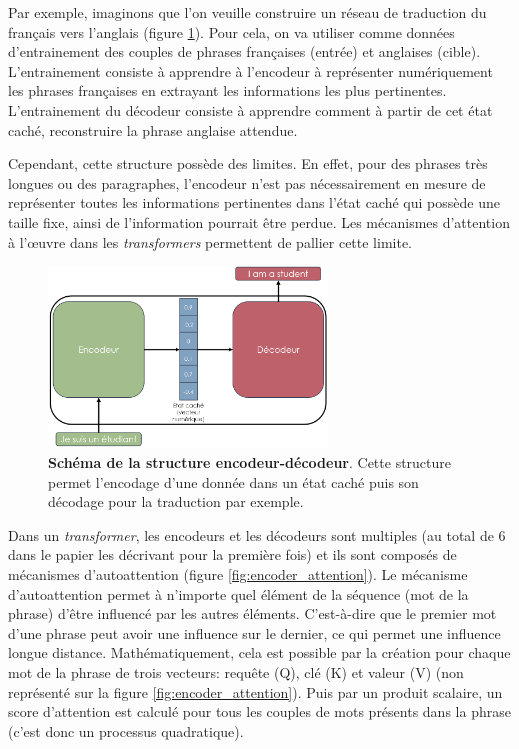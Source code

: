 Par exemple, imaginons que l'on veuille construire un réseau de traduction du français vers l’anglais (figure \ref{fig:encoder_decoder}). Pour cela, on va utiliser comme données d'entrainement des couples de phrases françaises (entrée) et anglaises (cible). L'entrainement consiste à apprendre à l'encodeur à représenter numériquement les phrases françaises en extrayant les informations les plus pertinentes. L'entrainement du décodeur consiste à apprendre comment à partir de cet état caché, reconstruire la phrase anglaise attendue.


Cependant, cette structure possède des limites. En effet, pour des phrases très longues ou des paragraphes, l'encodeur n'est pas nécessairement en mesure de représenter toutes les informations pertinentes dans l'état caché qui possède une taille fixe, ainsi de l'information pourrait être perdue. Les mécanismes d'attention à l'œuvre dans les \textit{transformers} permettent de pallier cette limite.
\begin{figure}[!ht]
 \centering
 \includegraphics[width=0.66\textwidth]{figures/encoder_decoder.png}
 \caption[Schéma de la structure encodeur-décodeur]{\textbf{Schéma de la structure encodeur-décodeur}. Cette structure permet l'encodage d'une donnée dans un état caché puis son décodage pour la traduction par exemple. }
 \label{fig:encoder_decoder}
\end{figure}

Dans un \textit{transformer}, les encodeurs et les décodeurs sont multiples (au total de 6 dans le papier les décrivant pour la première fois) et ils sont composés de mécanismes d'autoattention (figure \ref{fig:encoder_attention}). Le mécanisme d'autoattention permet à n'importe quel élément de la séquence (mot de la phrase) d'être influencé par les autres éléments. C'est-à-dire que le premier mot d'une phrase peut avoir une influence sur le dernier, ce qui permet une influence longue distance. Mathématiquement, cela est possible par la création pour chaque mot de la phrase de trois vecteurs: requête (Q), clé (K) et valeur (V) (non représenté sur la figure \ref{fig:encoder_attention}). Puis par un produit scalaire, un score d'attention est calculé pour tous les couples de mots présents dans la phrase (c'est donc un processus quadratique).



